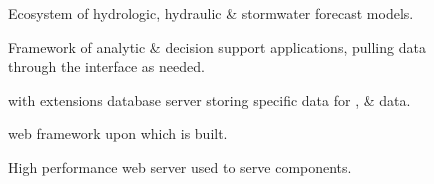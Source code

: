 \documentclass[letterpaper,12pt,english]{book}
\begin{document}
\begin{description}
\item[{{\hyperref[\detokenize{glossary:term-REON-WM}]{}}}] \leavevmode
\sphinxAtStartPar
Ecosystem of hydrologic, hydraulic \& stormwater forecast models.

\item[{{\hyperref[\detokenize{glossary:term-REON.cc}]{}}}] \leavevmode
\sphinxAtStartPar
Framework of {\hyperref[\detokenize{glossary:term-REON}]{}} analytic \& decision support applications, pulling data through the {\hyperref[\detokenize{glossary:term-GeoNode}]{}} {\hyperref[\detokenize{glossary:term-Django}]{}} interface as needed.

\item[{{\hyperref[\detokenize{glossary:term-REON-db}]{}}}] \leavevmode
\sphinxAtStartPar
{\hyperref[\detokenize{glossary:term-PostgreSQL}]{}} with {\hyperref[\detokenize{glossary:term-PostGIS}]{}} extensions database server storing {\hyperref[\detokenize{glossary:term-REON}]{}} specific data for {\hyperref[\detokenize{glossary:term-RTHS}]{}}, {\hyperref[\detokenize{glossary:term-REON-WM}]{}} \& {\hyperref[\detokenize{glossary:term-REON.cc}]{}} data.

\item[{{\hyperref[\detokenize{glossary:term-Django}]{}}}] \leavevmode
\sphinxAtStartPar
{\hyperref[\detokenize{glossary:term-Python}]{}} web framework upon which {\hyperref[\detokenize{glossary:term-GeoNode}]{}} is built.

\item[{{\hyperref[\detokenize{glossary:term-NGINX}]{}}}] \leavevmode
\sphinxAtStartPar
High performance web server used to serve {\hyperref[\detokenize{glossary:term-GeoNode}]{}} components.


\end{description}
\end{document}
